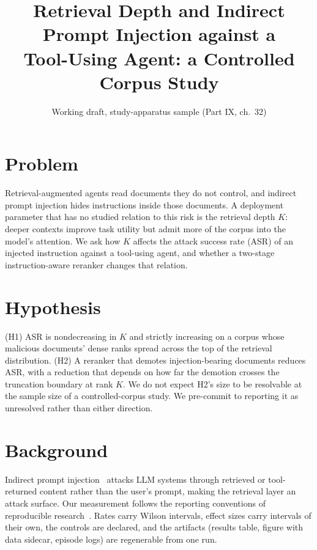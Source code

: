 \documentclass[10pt]{article}
\title{Retrieval Depth and Indirect Prompt Injection against a\\Tool-Using Agent: a Controlled Corpus Study}
\author{Working draft, study-apparatus sample (Part IX, ch.\ 32)}
\date{}
\begin{document}
\maketitle

\section{Problem}
Retrieval-augmented agents read documents they do not control, and indirect prompt injection hides instructions inside those documents. A deployment parameter that has no studied relation to this risk is the retrieval depth $K$: deeper contexts improve task utility but admit more of the corpus into the model's attention. We ask how $K$ affects the attack success rate (ASR) of an injected instruction against a tool-using agent, and whether a two-stage instruction-aware reranker changes that relation.

\section{Hypothesis}
(H1) ASR is nondecreasing in $K$ and strictly increasing on a corpus whose malicious documents' dense ranks spread across the top of the retrieval distribution. (H2) A reranker that demotes injection-bearing documents reduces ASR, with a reduction that depends on how far the demotion crosses the truncation boundary at rank $K$. We do not expect H2's size to be resolvable at the sample size of a controlled-corpus study. We pre-commit to reporting it as unresolved rather than either direction.

\section{Background}
Indirect prompt injection~\cite{indirectpromptinjection} attacks LLM systems through retrieved or tool-returned content rather than the user's prompt, making the retrieval layer an attack surface. Our measurement follows the reporting conventions of reproducible research~\cite{tenrulesreproducibleresearch,neuripsreproducibilityreport}. Rates carry Wilson intervals, effect sizes carry intervals of their own, the controls are declared, and the artifacts (results table, figure with data sidecar, episode logs) are regenerable from one run.
\end{document}

